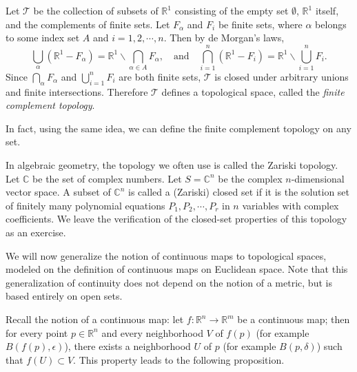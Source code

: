 \begin{example}
	Let $\mathcal{T}$ be the collection of subsets of $\mathbb{R}^1$
	consisting of the empty set $\emptyset$, $\mathbb{R}^1$ itself, and the
	complements of finite sets. Let $F_\alpha$ and $F_i$ be finite sets,
	where $\alpha$ belongs to some index set $A$ and $i=1,2,\cdots,n$. Then
	by de Morgan's laws,
	\begin{displaymath}
		\bigcup_{\alpha} \left(\mathbb{R}^1-F_\alpha\right) = \mathbb{R}^1
		\smallsetminus \bigcap_{\alpha\in A} F_\alpha,\quad \text{and}
		\quad \bigcap_{i=1}^n \left(\mathbb{R}^1 - F_i\right) =
		\mathbb{R}^1 \smallsetminus \bigcup_{i=1}^n F_i.
	\end{displaymath}
	Since $\bigcap_{\alpha} F_\alpha$ and $\bigcup_{i=1}^n F_i$ are both
	finite sets, $\mathcal{T}$ is closed under arbitrary unions and finite
	intersections. Therefore $\mathcal{T}$ defines a topological space,
	called the \emph{finite complement topology}.
\end{example}


In fact, using the same idea, we can define the finite complement topology on
any set.

\begin{example}
	In algebraic geometry, the topology we often use is called the Zariski
	topology. Let $\mathbb{C}$ be the set of complex numbers. Let
	$S = \mathbb{C}^n$ be the complex $n$-dimensional vector space. A subset
	of $\mathbb{C}^n$ is called a (Zariski) closed set if it is the solution
	set of finitely many polynomial equations $P_1,P_2,\cdots, P_r$ in $n$
	variables with complex coefficients. We leave the verification of the
	closed-set properties of this topology as an exercise.
\end{example}

We will now generalize the notion of continuous maps to topological spaces,
modeled on the definition of continuous maps on Euclidean space. Note that
this generalization of continuity does not depend on the notion of a metric,
but is based entirely on open sets.

Recall the notion of a continuous map: let $f:\mathbb{R}^n\to\mathbb{R}^m$ be
a continuous map; then for every point $p\in\mathbb{R}^n$ and every
neighborhood $V$ of $f(p)$ (for example $B(f(p),\epsilon)$), there exists a
neighborhood $U$ of $p$ (for example $B(p,\delta)$) such that
$f(U)\subset V$. This property leads to the following proposition.





